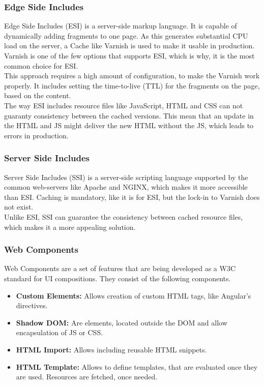 \subsubsection{Edge Side Includes}
Edge Side Includes (ESI) is a server-side markup language. It is capable of dynamically adding fragments to one page. As this generates substantial CPU load on the server, a Cache like Varnish is used to make it usable in production. Varnish is one of the few options that supports ESI, which is why, it is the most common choice for ESI.\\
This approach requires a high amount of configuration, to make the Varnish work properly. It includes setting the time-to-live (TTL) for the fragments on the page, based on the content.\\
The way ESI includes resource files like JavaScript, HTML and CSS can not guaranty consistency between the cached versions. This mean that an update in the HTML and JS might deliver the new HTML without the JS, which leads to errors in production.

\subsubsection{Server Side Includes}
Server Side Includes (SSI) is a server-side scripting language supported by the common web-servers like Apache and NGINX, which makes it more accessible than ESI. Caching is mandatory, like it is for ESI, but the lock-in to Varnish does not exist.\\
Unlike ESI, SSI can guarantee the consistency between cached resource files, which makes it a more appealing solution.


\subsubsection{Web Components}
Web Components are a set of features that are being developed as a W3C standard for UI compositions. They consist of the following components.
\begin{itemize}
	\item \textbf{Custom Elements:} Allows creation of custom HTML tags, like Angular's directives.
	\item \textbf{Shadow DOM:} Are elements, located outside the DOM and allow encapsulation of JS or CSS.
	\item \textbf{HTML Import:} Allows including reusable HTML snippets.
	\item \textbf{HTML Template:} Allows to define templates, that are evaluated once they are used. Resources are fetched, once needed.
\end{itemize}


